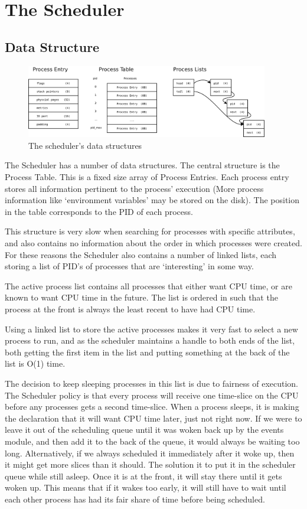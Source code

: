 \documentclass[a4paper]{report}
\begin{document}
\clearpage
\section{The Scheduler}


\subsection{Data Structure}

\begin{figure}[ht]
\centering
\includegraphics[width=400px]{images/Scheduler_Structure}
\caption{The scheduler's data structures}
\label{fig:WinTitleBarScreen}
\end{figure}


The Scheduler has a number of data structures. The central structure is the Process Table. This is a fixed size array of Process Entries. Each process entry stores all information pertinent to the process' execution (More process information like `environment variables' may be stored on the disk). The position in the table corresponds to the PID of each process.

This structure is very slow when searching for processes with specific attributes, and also contains no information about the order in which processes were created. For these reasons the Scheduler also contains a number of linked lists, each storing a list of PID's of processes that are `interesting' in some way.

The active process list contains all processes that either want CPU time, or are known to want CPU time in the future. The list is ordered in such that the process at the front is always the least recent to have had CPU time.

Using a linked list to store the active processes makes it very fast to select a new process to run, and as the scheduler maintains a handle to both ends of the list, both getting the first item in the list and putting something at the back of the list is O(1) time.

The decision to keep sleeping processes in this list is due to fairness of execution. The Scheduler policy is that every process will receive one time-slice on the CPU before any processes gets a second time-slice. When a process sleeps, it is making the declaration that it will want CPU time later, just not right now. If we were to leave it out of the scheduling queue until it was woken back up by the events module, and then add it to the back of the queue, it would always be waiting too long. Alternatively, if we always scheduled it immediately after it woke up, then it might get more slices than it should. The solution it to put it in the scheduler queue while still asleep. Once it is at the front, it will stay there until it gets woken up. This means that if it wakes too early, it will still have to wait until each other process has had its fair share of time before being scheduled.
\end{document}
